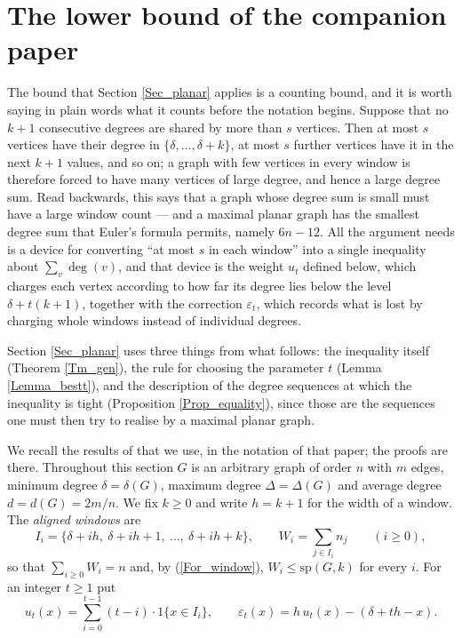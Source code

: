 \documentclass[12pt,a4paper]{article}%
\begin{document}

\section{The lower bound of the companion paper}
\label{Sec_prelim}

The bound that Section \ref{Sec_planar} applies is a counting bound, and it is
worth saying in plain words what it counts before the notation begins. Suppose
that no $k+1$ consecutive degrees are shared by more than $s$ vertices. Then at
most $s$ vertices have their degree in $\{\delta ,\ldots ,\delta +k\}$, at most
$s$ further vertices have it in the next $k+1$ values, and so on; a graph with
few vertices in every window is therefore forced to have many vertices of large
degree, and hence a large degree sum. Read backwards, this says that a graph
whose degree sum is small must have a large window count --- and a maximal planar graph has the smallest degree sum that Euler's formula permits, namely
$6n-12$. All the argument needs is a device for converting ``at most $s$ in each
window'' into a single inequality about $\sum_{v}\deg (v)$, and that device is
the weight $u_{t}$ defined below, which charges each vertex according to how far
its degree lies below the level $\delta +t(k+1)$, together with the correction
$\varepsilon _{t}$, which records what is lost by charging whole windows instead
of individual degrees.

Section \ref{Sec_planar} uses three things from what follows: the inequality
itself (Theorem \ref{Tm_gen}), the rule for choosing the parameter $t$ (Lemma
\ref{Lemma_bestt}), and the description of the degree sequences at which the
inequality is tight (Proposition \ref{Prop_equality}), since those are the
sequences one must then try to realise by a maximal planar graph.



We recall the results of \cite{P1} that we use, in the notation of that paper; the proofs are there. Throughout
this section $G$ is an arbitrary graph of order $n$ with $m$ edges, minimum degree $\delta =\delta (G)$, maximum
degree $\Delta =\Delta (G)$ and average degree $d=d(G)=2m/n$. We fix $k\geq 0$ and write $h=k+1$ for the width of a
window. The \emph{aligned windows} are
\[
I_{i}=\{\delta +ih,\ \delta +ih+1,\ \ldots ,\ \delta +ih+k\},\qquad W_{i}=\sum_{j\in I_{i}}n_{j}%
\qquad (i\geq 0),
\]
so that $\sum_{i\geq 0}W_{i}=n$ and, by (\ref{For_window}), $W_{i}\leq \mathrm{sp}(G,k)$ for every
$i$. For an integer $t\geq 1$ put
\[
u_{t}(x)=\sum_{i=0}^{t-1}(t-i)\cdot 1\{x\in I_{i}\},\qquad \varepsilon _{t}(x)=h\,u_{t}%
(x)-\left( \delta +th-x\right) .
\]
\end{document}
